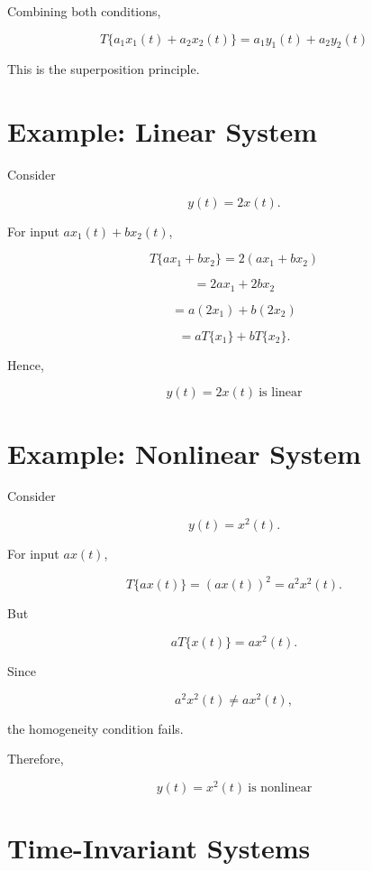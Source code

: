 Combining both conditions,

\[
\boxed{
T\{a_1x_1(t)+a_2x_2(t)\}
=
a_1y_1(t)+a_2y_2(t)
}
\]

This is the superposition principle.


\section{Example: Linear System}

Consider

\[
y(t)=2x(t).
\]

For input \(ax_1(t)+bx_2(t)\),

\[
T\{ax_1+bx_2\}
=
2(ax_1+bx_2)
\]

\[
=2ax_1+2bx_2
\]

\[
=a(2x_1)+b(2x_2)
\]

\[
=aT\{x_1\}+bT\{x_2\}.
\]

Hence,

\[
\boxed{
y(t)=2x(t)\ \text{is linear}
}
\]


\section{Example: Nonlinear System}

Consider

\[
y(t)=x^2(t).
\]

For input \(ax(t)\),

\[
T\{ax(t)\}=(ax(t))^2=a^2x^2(t).
\]

But

\[
aT\{x(t)\}=ax^2(t).
\]

Since

\[
a^2x^2(t)\neq ax^2(t),
\]

the homogeneity condition fails.

Therefore,

\[
\boxed{
y(t)=x^2(t)\ \text{is nonlinear}
}
\]


\section{Time-Invariant Systems}

